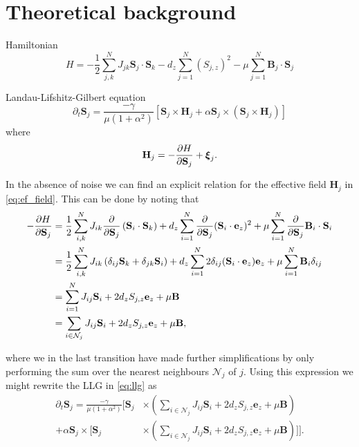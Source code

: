 \section{Theoretical background}

Hamiltonian 
\begin{equation}\label{eq:hamiltionian}
	H = - \frac{1}{2} \sum_{j,k}^{N} J_{jk} \mathbf{S}_j \cdot \mathbf{S}_k - d_z \sum_{j=1}^{N} (S_{j,z})^2 - \mu \sum_{j=1}^{N} \mathbf{B}_j \cdot \mathbf{S}_j
\end{equation}

Landau-Lifshitz-Gilbert equation 
\begin{equation}\label{eq:llg}
	\partial_t \mathbf{S}_j = \frac{-\gamma}{\mu(1 + \alpha^2)} \left[ \mathbf{S}_j \times \mathbf{H}_j + \alpha \mathbf{S}_j \times (\mathbf{S}_j \times \mathbf{H}_j) \right]
\end{equation}
where
\begin{equation}\label{eq:ef_field}
	\mathbf{H}_j = -\frac{\partial H}{\partial \mathbf{S}_j} + \boldsymbol{\xi}_j.
\end{equation}

In the absence of noise we can find an explicit relation for the effective field $\mathbf{H}_j$ in \eqref{eq:ef_field}. This can be done by noting that 
\begin{align*}
	-\frac{\partial H}{\partial \mathbf{S}_j} &= \frac{1}{2}\sum_{i,k}^{N} J_{ik} \frac{\partial}{\partial \mathbf{S}_j} \left( \mathbf{S}_i \cdot \mathbf{S}_k \right) + d_z \sum_{i=1}^{N} \frac{\partial }{\partial \mathbf{S}_j}(\mathbf{S}_i \cdot \mathbf{e}_z)^2 + \mu \sum_{i=1}^{N} \frac{\partial }{\partial \mathbf{S}_j} \mathbf{B}_i \cdot \mathbf{S}_i \\
	&= \frac{1}{2}\sum_{i,k}^{N} J_{ik} \left( \delta_{ij} \mathbf{S}_k + \delta_{jk} \mathbf{S}_i \right) + d_z \sum_{i=1}^N 2 \delta_{ij} (\mathbf{S}_i \cdot \mathbf{e}_z) \mathbf{e}_z + \mu \sum_{i=1}^N \mathbf{B}_i \delta_{ij} \\
	&= \sum_{i=1}^N J_{ij} \mathbf{S}_i + 2d_z S_{j,z} \mathbf{e}_z + \mu \mathbf{B} \\
	&= \sum_{i \in \mathcal{N}_j} J_{ij} \mathbf{S}_i + 2d_z S_{j,z} \mathbf{e}_z + \mu \mathbf{B}, 
\end{align*}

where we in the last transition have made further simplifications by only performing the sum over the nearest neighbours $\mathcal{N}_j$ of $j$. Using this expression we might rewrite the LLG in \eqref{eq:llg} as
\begin{align*}\label{eq:llg_simplified}
	\partial_t \mathbf{S}_j = \frac{-\gamma}{\mu(1 + \alpha^2)} \Bigg[ \mathbf{S}_j &\times \left( \sum_{i \in \mathcal{N}_j} J_{ij} \mathbf{S}_i + 2d_z S_{j,z} \mathbf{e}_z + \mu \mathbf{B} \right) \\
	+ \alpha \mathbf{S}_j \times \Bigg[  \mathbf{S}_j  &\times \left( \sum_{i \in \mathcal{N}_j} J_{ij} \mathbf{S}_i + 2d_z S_{j,z} \mathbf{e}_z + \mu \mathbf{B} \right) \Bigg] \Bigg].
\end{align*}